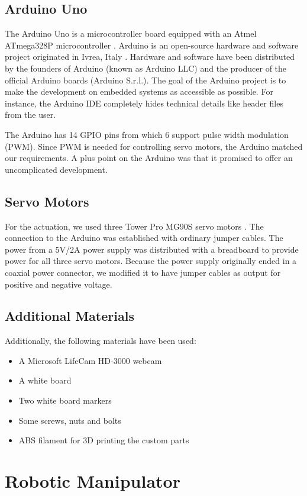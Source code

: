 \documentclass{sig-alternate-05-2015}
\begin{document}
\subsection{Arduino Uno}
The Arduino Uno is a microcontroller board equipped with an Atmel ATmega328P microcontroller \cite{Atm}. Arduino is an open-source hardware and software project originated in Ivrea, Italy \cite{Ard}. Hardware and software have been distributed by the founders of Arduino (known as Arduino LLC) and the producer of the official Arduino boards (Arduino S.r.l.). The goal of the Arduino project is to make the development on embedded systems as accessible as possible. For instance, the Arduino IDE completely hides technical details like header files from the user.

The Arduino has 14 GPIO pins from which 6 support pulse width modulation (PWM). Since PWM is needed for controlling servo motors, the Arduino matched our requirements. A plus point on the Arduino was that it promised to offer an uncomplicated development.

\subsection{Servo Motors}
For the actuation, we used three Tower Pro MG90S servo motors \cite{Ser}.  The connection to the Arduino was established with ordinary jumper cables. The power from a 5V/2A power supply was distributed with a breadboard to provide power for all three servo motors. Because the power supply originally ended in a coaxial power connector, we modified it to have jumper cables as output for positive and negative voltage.

\subsection{Additional Materials}
Additionally, the following materials have been used:
\begin{itemize}
	\item A Microsoft LifeCam HD-3000 webcam
	\item A white board
	\item Two white board markers
	\item Some screws, nuts and bolts
	\item ABS filament for 3D printing the custom parts
\end{itemize}

\section{Robotic Manipulator}
\end{document}
